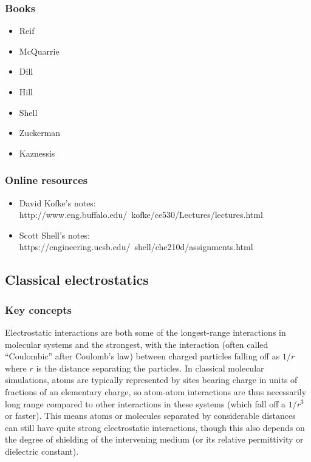\documentclass[9pt,bestpractices]{livecoms}
\begin{document}
\subsubsection{Books}
\begin{itemize}
\item Reif
\item McQuarrie
\item Dill
\item Hill
\item Shell
\item Zuckerman
\item Kaznessis
\end{itemize}
\subsubsection{Online resources}
\begin{itemize}
\item David Kofke's notes: http://www.eng.buffalo.edu/~kofke/ce530/Lectures/lectures.html
\item Scott Shell's notes: https://engineering.ucsb.edu/~shell/che210d/assignments.html
\end{itemize}

\subsection{Classical electrostatics}
\label{sec:classical_electrostatics}
\subsubsection{Key concepts}

Electrostatic interactions are both some of the longest-range interactions in
molecular systems and the strongest, with the interaction (often called
``Coulombic'' after Coulomb's law) between charged particles falling off as
$1/r$ where $r$ is the distance separating the particles.  In classical
molecular simulations, atoms are typically represented by sites bearing charge
in units of fractions of an elementary charge, so atom-atom interactions are
thus necessarily long range compared to other interactions in these systems
(which fall off a $1/r^3$ or faster).  This means atoms or molecules separated
by considerable distances can still have quite strong electrostatic
interactions, though this also depends on the degree of shielding of the
intervening medium (or its relative permittivity or dielectric constant).
\end{document}
